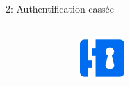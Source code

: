 \documentclass[final,hyperref={pdfpagelabels=false}]{beamer}
\begin{document}
\begin{frame}[t]
\begin{columns}[t]
\begin{column}{.465\textwidth}
\end{column} %

\begin{column}{.03\textwidth}\end{column} %
 
\begin{column}{.465\textwidth} %
            
	\begin{block}{2: Authentification cassée}

		\begin{columns}[T]

			\begin{column}{.01\textwidth}
			\end{column}
			\begin{column}{.115\textwidth} %
				\includegraphics[scale=2.3]{rimlock.png}
			\end{column}


\end{columns}
\end{block}
\end{column}
\end{columns}
\end{frame}
\end{document}
